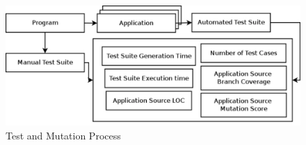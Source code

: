 \begin{figure}[!t]
\centering
\captionsetup{justification=centering}
  \includegraphics[width=\linewidth]{proccess_diagram.pdf}
    \caption{Test and Mutation Process}
  \label{fig:process_diagram}
\end{figure}

